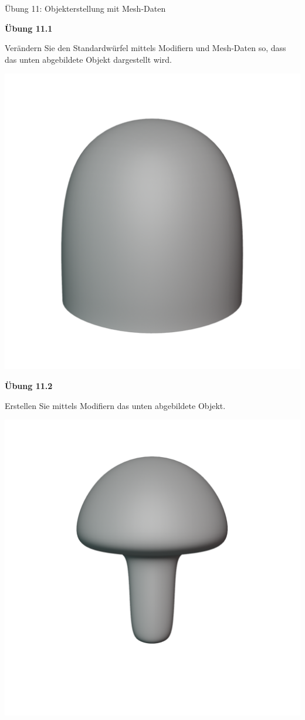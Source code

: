 \documentclass[
]{book}
\begin{document}
Übung 11: Objekterstellung mit Mesh-Daten

\textbf{Übung 11.1}

Verändern Sie den Standardwürfel mittels Modifiern und Mesh-Daten so,
dass das unten abgebildete Objekt dargestellt wird.

\hfill
\includegraphics{Chapters/Images/Chapter_15/Exercise_11_1.png}

\textbf{Übung 11.2}

Erstellen Sie mittels Modifiern das unten abgebildete Objekt.

\hfill
\includegraphics{Chapters/Images/Chapter_15/Exercise_11_2.png}
\end{document}
